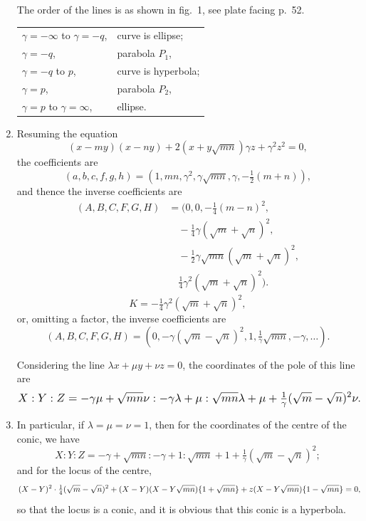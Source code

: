 \documentclass[12pt,a4paper]{article}
\theoremstyle{plain}
\theoremstyle{definition}
\theoremstyle{remark}
\begin{document}
\begin{enumerate}[label=\arabic*.]
The order of the lines is as shown in fig.~1, see plate facing p.~52.

\begin{tabular}{ll}
$\gamma = -\infty$ to $\gamma = -q$, & curve is ellipse; \\
$\gamma = -q$, & parabola $P_1$, \\
$\gamma = -q$ to $p$, & curve is hyperbola; \\
$\gamma = p$, & parabola $P_2$, \\
$\gamma = p$ to $\gamma = \infty$, & ellipse.
\end{tabular}

\item Resuming the equation
\[(x - my)(x - ny) + 2(x + y\sqrt{mn})\gamma z + \gamma^2 z^2 = 0,\]
the coefficients are
\[(a,b,c,f,g,h) = (1, mn, \gamma^2, \gamma\sqrt{mn}, \gamma, -\tfrac{1}{2}(m + n)),\]
and thence the inverse coefficients are
\begin{align*}
(A,B,C,F,G,H) &= (0, 0, -\tfrac{1}{4}(m - n)^2, \\
&\quad -\tfrac{1}{4}\gamma(\sqrt{m} + \sqrt{n})^2, \\
&\quad -\tfrac{1}{2}\gamma\sqrt{mn}(\sqrt{m} + \sqrt{n})^2, \\
&\quad \tfrac{1}{4}\gamma^2(\sqrt{m} + \sqrt{n})^2).
\end{align*}
\[K = -\tfrac{1}{4}\gamma^2(\sqrt{m} + \sqrt{n})^2,\]
or, omitting a factor, the inverse coefficients are
\[(A,B,C,F,G,H) = (0, -\gamma(\sqrt{m} - \sqrt{n})^2, 1, \tfrac{1}{\gamma}\sqrt{mn}, -\gamma, \ldots).\]

Considering the line $\lambda x + \mu y + \nu z = 0$, the coordinates of the pole of this line are
\[
\resizebox{\textwidth}{!}{$\displaystyle X : Y : Z = -\gamma\mu + \sqrt{mn}\nu : -\gamma\lambda + \mu : \sqrt{mn}\lambda + \mu + \tfrac{1}{\gamma}(\sqrt{m} - \sqrt{n})^2\nu. $}
\]

\item In particular, if $\lambda = \mu = \nu = 1$, then for the coordinates of the centre of the conic, we have
\[X : Y : Z = -\gamma + \sqrt{mn} : -\gamma + 1 : \sqrt{mn} + 1 + \tfrac{1}{\gamma}(\sqrt{m} - \sqrt{n})^2;\]
and for the locus of the centre,
\[
\resizebox{\textwidth}{!}{$\displaystyle (X - Y)^2 \cdot \tfrac{1}{4}(\sqrt{m} - \sqrt{n})^2 + (X - Y)(X - Y\sqrt{mn})\{1 + \sqrt{mn}\} + z(X - Y\sqrt{mn})\{1 - \sqrt{mn}\} = 0, $}
\]
so that the locus is a conic, and it is obvious that this conic is a hyperbola.


\end{enumerate}
\end{document}
